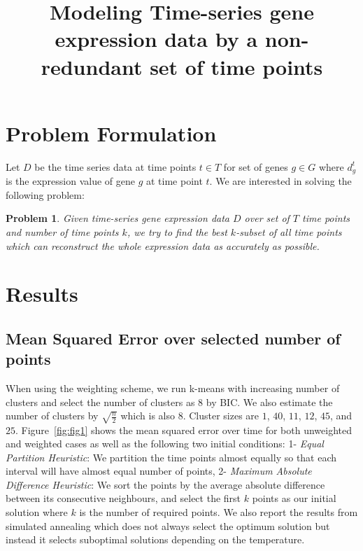 \documentclass{article}
\title{Modeling Time-series gene expression data by a non-redundant set of time points}
\newtheorem{problem}{Problem}
\begin{document}
\maketitle

\section{Problem Formulation}

Let $D$ be the time series data at time points $t \in T$ for set of genes $g \in G$ where $d_{g}^{t}$ is the expression value of gene $g$ at time point $t$. We are interested in solving the following problem:

\begin{problem}
Given time-series gene expression data $D$ over set of $T$ time points and number of time points $k$, we try to find the best $k$-subset of all time points which can reconstruct the whole expression data as accurately as possible.
\end{problem}

\section{Results}

\subsection{Mean Squared Error over selected number of points}\label{sec:errtime}

When using the weighting scheme, we run k-means with increasing number
of clusters and select the number of clusters as $8$ by BIC. We also
estimate the number of clusters by $\sqrt{\frac{n}{2}}$ which is also
$8$. Cluster sizes are $1$, $40$, $11$, $12$, $45$, and $25$. Figure~\ref{fig:fig1}
shows the mean squared error over time for both unweighted and
weighted cases as well as the following two initial conditions: 1-
\textit{Equal Partition Heuristic}: We partition the time points
almost equally so that each interval will have almost equal number of points, 2- \textit{Maximum Absolute Difference Heuristic}: We sort the points by the average absolute difference between
its consecutive neighbours, and select the first $k$ points as our initial solution where $k$ is the number of required points. We also
report the results from simulated annealing which does not always select the optimum solution but instead it selects suboptimal solutions depending on the temperature.
\end{document}

